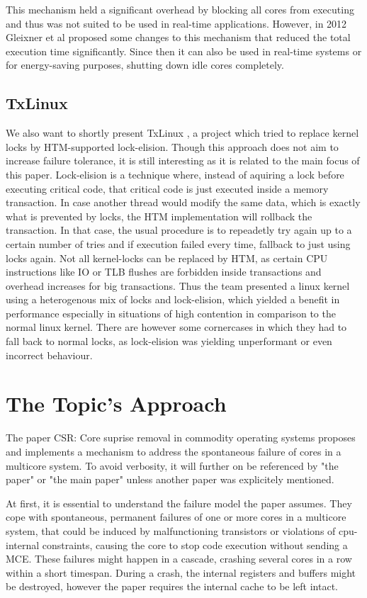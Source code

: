 \documentclass[a4paper,10pt,twoside]{article}
\begin{document}
This mechanism held a significant overhead by blocking all cores from executing and thus was not suited to be used in real-time applications. However, in 2012 Gleixner et al proposed some changes \cite{Efficient_Hotplug} to this mechanism that reduced the total execution time significantly. Since then it can also be used in real-time systems or for energy-saving purposes, shutting down idle cores completely.

\subsection{TxLinux}
We also want to shortly present TxLinux \cite{TxLinux}, a project which tried to replace kernel locks by HTM-supported lock-elision. Though this approach does not aim to increase failure tolerance, it is still interesting as it is related to the main focus of this paper. Lock-elision is a technique where, instead of aquiring a lock before executing critical code, that critical code is just executed inside a memory transaction. In case another thread would modify the same data, which is exactly what is prevented by locks, the HTM implementation will rollback the transaction. In that case, the usual procedure is to repeadetly try again up to a certain number of tries and if execution failed every time, fallback to just using locks again. Not all kernel-locks can be replaced by HTM, as certain CPU instructions like IO or TLB flushes are forbidden inside transactions and overhead increases for big transactions. Thus the team presented a linux kernel using a heterogenous mix of locks and lock-elision, which yielded a benefit in performance especially in situations of high contention in comparison to the normal linux kernel. There are however some cornercases in which they had to fall back to normal locks, as lock-elision was yielding unperformant or even incorrect behaviour.

\section{The Topic's Approach}
The paper CSR: Core suprise removal in commodity operating systems \cite{CSR} proposes and implements a mechanism to address the spontaneous failure of cores in a multicore system. To avoid verbosity, it will further on be referenced by "the paper" or "the main paper" unless another paper was explicitely mentioned.

At first, it is essential to understand the failure model the paper assumes. They cope with spontaneous, permanent failures of one or more cores in a multicore system, that could be induced by malfunctioning transistors or violations of cpu-internal constraints, causing the core to stop code execution without sending a MCE. These failures might happen in a cascade, crashing several cores in a row within a short timespan. During a crash, the internal registers and buffers might be destroyed, however the paper requires the internal cache to be left intact.
\end{document}
